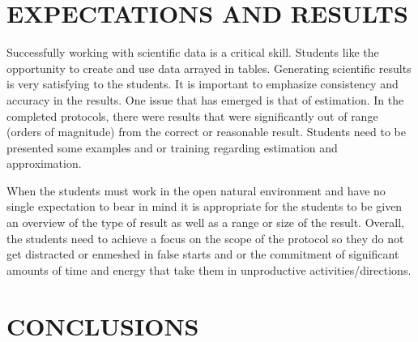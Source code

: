 \documentclass[11.5pt]{sig-alternate} %
\begin{document}
\begin{large}
\section*{EXPECTATIONS AND RESULTS}

Successfully working with scientific data is a critical skill. Students like the opportunity to create and use data arrayed in tables. Generating scientific results is very satisfying to the students. It is important to emphasize consistency and accuracy in the results. One issue that has emerged is that of estimation. In the completed protocols, there were results that were significantly out of range (orders of magnitude) from the correct or reasonable result. Students need to be presented some examples and or training regarding estimation and approximation. 

When the students must work in the open natural environment and have no single expectation to bear in mind it is appropriate for the students to be given an overview of the type of result as well as a range or size of the result. Overall, the students need to achieve a focus on the scope of the protocol so they do not get distracted or enmeshed in false starts and or the commitment of significant amounts of time and energy that take them in unproductive activities/directions. 
\\
\section*{CONCLUSIONS}


\end{large}
\end{document}
